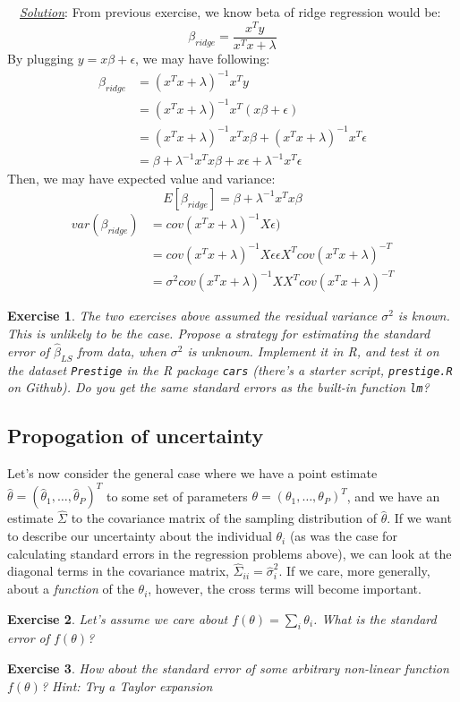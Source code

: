 \documentclass[twoside]{article}
\newcounter{lecnum}
\newtheorem{exercise}{Exercise}[lecnum]
\newenvironment{solution}{
  \begin{flushleft} \noindent ~~\underline{\emph{Solution}}: \rmfamily}{\end{flushleft}}
\begin{document}
\begin{solution}
From previous exercise, we know beta of ridge regression would be: 
$$ \beta_{ridge} = \frac{x^Ty}{x^Tx+\lambda}$$
By plugging $y=x\beta+\epsilon$, we may have following:
\begin{equation*}
\begin{split}
\beta_{ridge} &= (x^Tx+\lambda)^{-1}{x^Ty}  \\ &= (x^Tx+\lambda)^{-1}x^T(x\beta+\epsilon) \\ &= (x^Tx+\lambda)^{-1}x^Tx\beta + (x^Tx+\lambda)^{-1}x^T\epsilon \\ &= \beta +\lambda^{-1}x^Tx\beta + x\epsilon+\lambda^{-1}x^T\epsilon
\end{split}
\end{equation*}
Then, we may have expected value and variance:
$$E[\beta_{ridge}] = \beta +\lambda^{-1}x^Tx\beta $$
\begin{equation*}
\begin{split}
var(\beta_{ridge}) &= cov(x^Tx+\lambda)^{-1} X \epsilon) \\ &= cov(x^Tx+\lambda)^{-1} X \epsilon \epsilon X^T cov(x^Tx+\lambda)^{-T} \\&= \sigma^2 cov(x^Tx+\lambda)^{-1} XX^T cov(x^Tx+\lambda)^{-T}
\end{split}
\end{equation*}
\end{solution}

\begin{exercise}
  The two exercises above assumed the residual variance $\sigma^2$ is known. This is unlikely to be the case. Propose a strategy for estimating the standard error of $\hat{\beta}_{LS}$ from data, when $\sigma^2$ is unknown. Implement it in R, and test it on the dataset \texttt{Prestige} in the R package \texttt{cars} (there's a starter script, \texttt{prestige.R} on Github). Do you get the same standard errors as the built-in function \texttt{lm}?
\end{exercise}


\subsection{Propogation of uncertainty}
Let's now consider the general case where we have a point estimate $\hat{\theta} = (\hat{\theta}_1,\dots, \hat{\theta}_P)^T$ to some set of parameters $\theta = (\theta_1,\dots,\theta_P)^T$, and we have an estimate $\hat{\Sigma}$ to the covariance matrix of the sampling distribution of $\hat{\theta}$. If we want to describe our uncertainty about the individual $\theta_i$ (as was the case for calculating standard errors in the regression problems above), we can look at the diagonal terms in the covariance matrix, $\hat{\Sigma}_{ii} = \hat{\sigma}_i^2$. If we care, more generally, about a \textit{function} of the $\theta_i$, however, the cross terms will become important.

\begin{exercise}
  Let's assume we care about $f(\theta) = \sum_i \theta_i$. What is the standard error of $f(\theta)$?
\end{exercise}

\begin{exercise}
  How about the standard error of some arbitrary non-linear function $f(\theta)$? \textit{Hint: Try a Taylor expansion}
\end{exercise}
\end{document}
